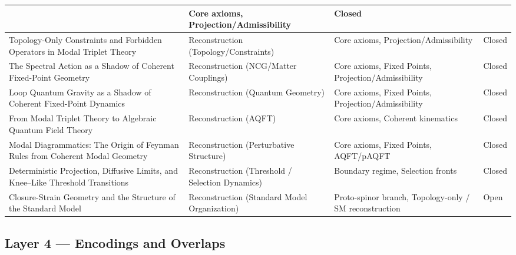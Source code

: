 \documentclass[11pt]{article}
\begin{document}
\begin{center}
\begin{tabular}{|p{7.2cm}|p{3.6cm}|p{3.6cm}|p{1.6cm}|}
& Core axioms, Projection/Admissibility
& Closed\\
\hline
Topology-Only Constraints and Forbidden Operators in Modal Triplet Theory
& Reconstruction (Topology/Constraints)
& Core axioms, Projection/Admissibility
& Closed\\
\hline
The Spectral Action as a Shadow of Coherent Fixed-Point Geometry
& Reconstruction (NCG/Matter Couplings)
& Core axioms, Fixed Points, Projection/Admissibility
& Closed\\
\hline
Loop Quantum Gravity as a Shadow of Coherent Fixed-Point Dynamics
& Reconstruction (Quantum Geometry)
& Core axioms, Fixed Points, Projection/Admissibility
& Closed\\
\hline
From Modal Triplet Theory to Algebraic Quantum Field Theory
& Reconstruction (AQFT) & Core axioms, Coherent kinematics & Closed \\
\hline
Modal Diagrammatics: The Origin of Feynman Rules from Coherent Modal Geometry
& Reconstruction (Perturbative Structure) & Core axioms, Fixed Points, AQFT/pAQFT & Closed \\
\hline
Deterministic Projection, Diffusive Limits, and Knee–Like Threshold Transitions
& Reconstruction (Threshold / Selection Dynamics) & Boundary regime, Selection fronts & Closed \\
\hline
Closure-Strain Geometry and the Structure of the Standard Model
& Reconstruction (Standard Model Organization) & Proto-spinor branch, Topology-only / SM reconstruction & Open \\
\hline
\end{tabular}
\end{center}

\subsection{Layer 4 --- Encodings and Overlaps}
\end{document}
